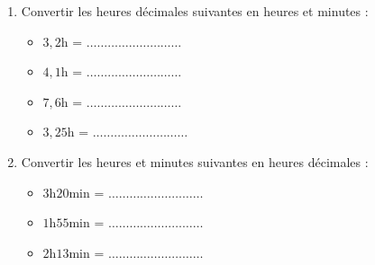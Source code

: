\begin{pageParcourst}
\begin{enumerate}
\item Convertir les heures décimales suivantes en heures et minutes :
 
 \begin{itemize}
\item $3,2$h = $\ldots\ldots\ldots\ldots\ldots\ldots\ldots\ldots\ldots$
\item $4,1$h = $\ldots\ldots\ldots\ldots\ldots\ldots\ldots\ldots\ldots$
\item $7,6$h = $\ldots\ldots\ldots\ldots\ldots\ldots\ldots\ldots\ldots$
\item $3,25$h = $\ldots\ldots\ldots\ldots\ldots\ldots\ldots\ldots\ldots$
\end{itemize}
 
\item  Convertir les heures et minutes suivantes en heures décimales :
 \begin{itemize}
\item $3$h$20$min = $\ldots\ldots\ldots\ldots\ldots\ldots\ldots\ldots\ldots$
\item $1$h$55$min = $\ldots\ldots\ldots\ldots\ldots\ldots\ldots\ldots\ldots$
\item $2$h$13$min = $\ldots\ldots\ldots\ldots\ldots\ldots\ldots\ldots\ldots$
\end{itemize} 

\end{enumerate}
  
\end{pageParcourst}


